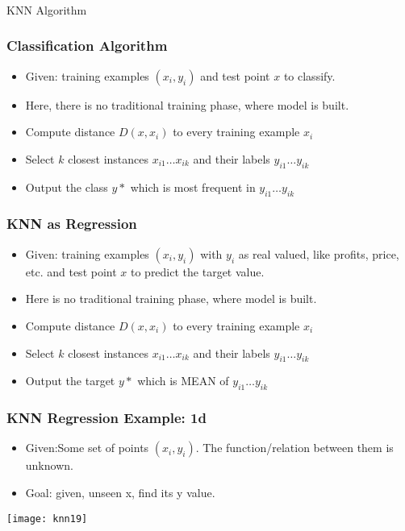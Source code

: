 \begin{frame}[fragile]\frametitle{}
\begin{center}
{\Large KNN Algorithm}
\end{center}
\end{frame}

\begin{frame}[fragile]\frametitle{Classification Algorithm}
\begin{itemize}
\item Given: training examples $(x_i,y_i)$ and test point $x$ to classify.
\item Here, there is no traditional training phase, where model is built.
\item Compute distance $D(x,x_i)$ to every training example $x_i $
\item Select $k$ closest instances $x_{i1} \ldots x_{ik}$ and their labels $y_{i1} \ldots y_{ik}$
\item Output the class $y*$ which is most frequent in $y_{i1} \ldots y_{ik}$
\end{itemize}
\end{frame}


\begin{frame}[fragile]\frametitle{KNN as Regression}
\begin{itemize}
\item Given: training examples $(x_i,y_i)$ with $y_i$ as real valued, like profits, price, etc. and test point $x$ to predict the target value.
\item Here is no traditional training phase, where model is built.
\item Compute distance $D(x,x_i)$ to every training example $x_i $
\item Select $k$ closest instances $x_{i1} \ldots x_{ik}$ and their labels $y_{i1} \ldots y_{ik}$
\item Output the target $y*$ which is MEAN of $y_{i1} \ldots y_{ik}$
\end{itemize}
\end{frame}

\begin{frame}[fragile]\frametitle{KNN Regression Example: 1d}
\begin{itemize}
\item Given:Some set of points $(x_i,y_i)$. The function/relation between them is unknown.
\item Goal: given, unseen x, find its y value.
\end{itemize}
\begin{center}
\texttt{[image: knn19]}
\end{center}
\end{frame}

